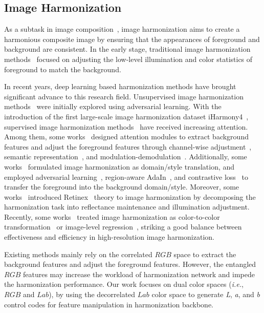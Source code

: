 \documentclass[sigconf]{acmart}
\begin{document}
\subsection{Image Harmonization}
As a subtask in image composition~\cite{niu2021making}, image harmonization aims to create a harmonious composite image by ensuring that the appearances of foreground and background are consistent. 
In the early stage, traditional image harmonization methods~\cite{lalonde2007using} focused on adjusting the low-level illumination and color statistics of foreground to match the background.

In recent years, deep learning based harmonization methods have brought significant advance to this research field. 
Unsupervised image harmonization methods~\cite{zhu2015learning} were initially explored using adversarial learning.
With the introduction of the first large-scale image harmonization dataset iHarmony4~\cite{dovenet}, supervised image harmonization methods~\cite{charmnet, Scs-co, S2CRNet, ssh, xing2022composite,peng2022frih,bao2022deep,zhu2022image,chen2023dense,chen2022hierarchical, PHDNet, ren2022semantic} have received increasing attention. 
Among them, some works~\cite{ssam, issam, feature_mod} designed attention modules to extract background features and adjust the foreground features through channel-wise adjustment~\cite{ssam}, semantic representation~\cite{issam, dih}, and modulation-demodulation~\cite{feature_mod}.
Additionally, some works~\cite{dovenet, rainnet, bargainnet} formulated image harmonization as domain/style translation, and employed adversarial learning~\cite{dovenet}, region-aware AdaIn~\cite{rainnet}, and contrastive loss~\cite{bargainnet} to transfer the foreground into the background domain/style. 
Moreover, some works~\cite{intrinsic, IHT, HT} introduced Retinex~\cite{land1971lightness} theory to image harmonization by decomposing the harmonization task into reflectance maintenance and illumination adjustment. 
Recently, some works~\cite{harmonizer, CDTNet} treated image harmonization as color-to-color transformation~\cite{CDTNet} or image-level regression~\cite{harmonizer}, striking a good balance between effectiveness and efficiency in high-resolution image harmonization.

Existing methods mainly rely on the correlated $RGB$ space to extract the background features and adjust the foreground features. However, the entangled $RGB$ features may increase the workload of harmonization network and impede the harmonization performance.
Our work focuses on dual color spaces (\emph{i.e.}, $RGB$ and $Lab$), by using the decorrelated $Lab$ color space to generate \textit{L}, \textit{a}, and \textit{b} control codes for feature manipulation in harmonization backbone. 
\end{document}

